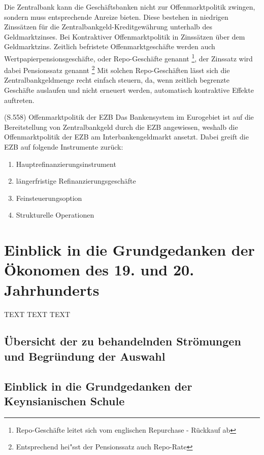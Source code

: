 \documentclass[
        onecolumn,
        a4paper,
        abstracton,
        parskip=half
        ,final
        ]{scrartcl}
\begin{document}
Die Zentralbank kann die Gesch{\"a}ftsbanken nicht zur Offenmarktpolitik zwingen, sondern muss entsprechende Anreize bieten. Diese bestehen in niedrigen Zinss{\"a}tzen f{\"u}r die Zentralbankgeld-Kreditgew{\"a}hrung unterhalb des Geldmarktzinses. Bei Kontraktiver Offenmarktpolitik in Zinss{\"a}tzen {\"u}ber dem Geldmarktzins.
Zeitlich befristete Offenmarktgesch{\"a}fte werden auch Wertpapierpensionsgesch{\"a}fte, oder Repo-Gesch{\"a}fte genannt \footnote[36]{Repo-Gesch{\"a}fte leitet sich vom englischen Repurchase - R{\"u}ckkauf ab}, der Zinssatz wird dabei Pensionssatz genannt \footnote[37]{Entsprechend hei{"ss}t der Pensionssatz auch Repo-Rate}
Mit solchen Repo-Gesch{\"a}ften l{\"a}sst sich die Zentralbankgeldmenge recht einfach steuern, da, wenn zeitlich begrenzte Gesch{\"a}fte auslaufen und nicht erneuert werden, automatisch kontraktive Effekte auftreten.


(S.558)
Offenmarktpolitik der EZB
Das Bankensystem im Eurogebiet ist auf die Bereitstellung von Zentralbankgeld durch die EZB angewiesen, weshalb die Offenmarktpolitik der EZB am Interbankengeldmarkt ansetzt. Dabei greift die EZB auf folgende Instrumente zur{\"u}ck:
\begin{enumerate}
  \item{Hauptrefinanzierungsinstrument}
  \item{l{\"a}ngerfristige Refinanzierungsgesch{\"a}fte}
  \item{Feinsteuerungsoption}
  \item{Strukturelle Operationen}
  \end{enumerate}


\clearpage

\section{Einblick in die Grundgedanken der {\"O}konomen des 19. und 20. Jahrhunderts}
  \label{sec3:stroemungen}
  TEXT TEXT TEXT


\subsection{{\"U}bersicht der zu behandelnden Str{\"o}mungen und Begr{\"u}ndung der Auswahl}

\subsection{Einblick in die Grundgedanken der Keynsianischen Schule}
\end{document}
